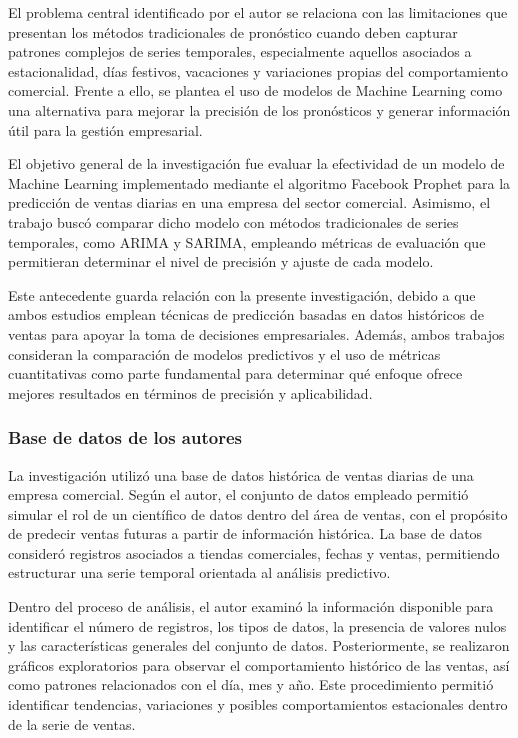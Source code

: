 El problema central identificado por el autor se relaciona con las limitaciones que presentan los métodos tradicionales de pronóstico cuando deben capturar patrones complejos de series temporales, especialmente aquellos asociados a estacionalidad, días festivos, vacaciones y variaciones propias del comportamiento comercial. Frente a ello, se plantea el uso de modelos de Machine Learning como una alternativa para mejorar la precisión de los pronósticos y generar información útil para la gestión empresarial.

El objetivo general de la investigación fue evaluar la efectividad de un modelo de Machine Learning implementado mediante el algoritmo Facebook Prophet para la predicción de ventas diarias en una empresa del sector comercial. Asimismo, el trabajo buscó comparar dicho modelo con métodos tradicionales de series temporales, como ARIMA y SARIMA, empleando métricas de evaluación que permitieran determinar el nivel de precisión y ajuste de cada modelo.

Este antecedente guarda relación con la presente investigación, debido a que ambos estudios emplean técnicas de predicción basadas en datos históricos de ventas para apoyar la toma de decisiones empresariales. Además, ambos trabajos consideran la comparación de modelos predictivos y el uso de métricas cuantitativas como parte fundamental para determinar qué enfoque ofrece mejores resultados en términos de precisión y aplicabilidad.

\subsubsection{Base de datos de los autores}

La investigación utilizó una base de datos histórica de ventas diarias de una empresa comercial. Según el autor, el conjunto de datos empleado permitió simular el rol de un científico de datos dentro del área de ventas, con el propósito de predecir ventas futuras a partir de información histórica. La base de datos consideró registros asociados a tiendas comerciales, fechas y ventas, permitiendo estructurar una serie temporal orientada al análisis predictivo.

Dentro del proceso de análisis, el autor examinó la información disponible para identificar el número de registros, los tipos de datos, la presencia de valores nulos y las características generales del conjunto de datos. Posteriormente, se realizaron gráficos exploratorios para observar el comportamiento histórico de las ventas, así como patrones relacionados con el día, mes y año. Este procedimiento permitió identificar tendencias, variaciones y posibles comportamientos estacionales dentro de la serie de ventas.

